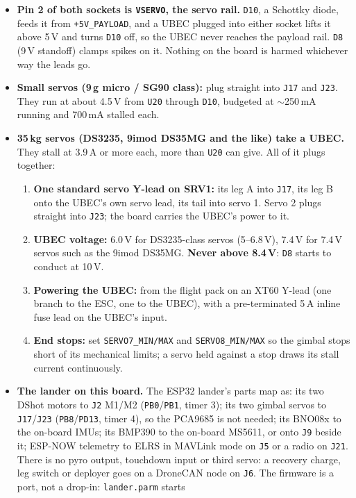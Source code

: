 \documentclass[11pt,a4paper]{article}
\newcommand{\file}[1]{\texttt{\small #1}}
\newcommand{\flag}[1]{\textcolor{warnred}{\textbf{#1}}}
\begin{document}
\begin{itemize}
\item \textbf{Pin 2 of both sockets is \file{VSERVO}, the servo rail.} \file{D10}, a Schottky
diode, feeds it from \file{+5V\_PAYLOAD}, and a UBEC plugged into either socket lifts it above
5\,V and turns \file{D10} off, so the UBEC never reaches the payload rail. \file{D8} (9\,V
standoff) clamps spikes on it. Nothing on the board is harmed whichever way the leads go.
\item \textbf{Small servos (9\,g micro / SG90 class):} plug straight into \file{J17} and \file{J23}.
They run at about 4.5\,V from \file{U20} through \file{D10}, budgeted at $\sim$250\,mA running and
700\,mA stalled each.
\item \textbf{35\,kg servos (DS3235, 9imod DS35MG and the like) take a UBEC.} They stall at
3.9\,A or more each, more than \file{U20} can give. All of it plugs together:
\begin{enumerate}
\item \textbf{One standard servo Y-lead on SRV1:} its leg A into \file{J17}, its leg B onto the
UBEC's own servo lead, its tail into servo 1. Servo 2 plugs straight into \file{J23}; the board
carries the UBEC's power to it.
\item \textbf{UBEC voltage:} 6.0\,V for DS3235-class servos (5--6.8\,V), 7.4\,V for 7.4\,V servos
such as the 9imod DS35MG. \flag{Never above 8.4\,V}: \file{D8} starts to conduct at 10\,V.
\item \textbf{Powering the UBEC:} from the flight pack on an XT60 Y-lead (one branch to the ESC,
one to the UBEC), with a pre-terminated 5\,A inline fuse lead on the UBEC's input.
\item \textbf{End stops:} set \file{SERVO7\_MIN/MAX} and \file{SERVO8\_MIN/MAX} so the gimbal
stops short of its mechanical limits; a servo held against a stop draws its stall current
continuously.
\end{enumerate}
\item \textbf{The lander on this board.} The ESP32 lander's parts map as: its two DShot
motors to \file{J2} M1/M2 (\file{PB0}/\file{PB1}, timer 3); its two gimbal servos to
\file{J17}/\file{J23} (\file{PB8}/\file{PD13}, timer 4), so the PCA9685 is not needed; its
BNO08x to the on-board IMUs; its BMP390 to the on-board MS5611, or onto \file{J9} beside it;
ESP-NOW telemetry to ELRS in MAVLink mode on \file{J5} or a radio on \file{J21}. There is no
pyro output, touchdown input or third servo: a recovery charge, leg switch or deployer goes on
a DroneCAN node on \file{J6}. The firmware is a port, not a drop-in: \file{lander.parm} starts

\end{itemize}
\end{document}

